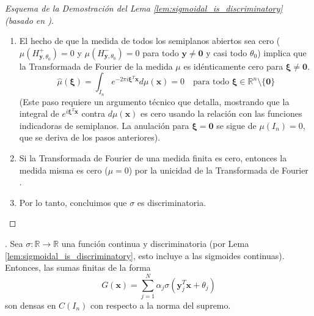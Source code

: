 \begin{proof}[Esquema de la Demostración del Lema \ref{lem:sigmoidal_is_discriminatory} (basado en \citet{Cybenko1989})]
\begin{enumerate}
        \item El hecho de que la medida de todos los semiplanos abiertos sea cero ($\mu(H_{\mathbf{y},\theta_0}^+) = 0$ y $\mu(H_{\mathbf{y},\theta_0}^-) = 0$ para todo $\mathbf{y} \neq \mathbf{0}$ y casi todo $\theta_0$) implica que la Transformada de Fourier de la medida $\mu$ es idénticamente cero para $\boldsymbol{\xi} \neq \mathbf{0}$.
        \[ \hat{\mu}(\boldsymbol{\xi}) = \int_{I_n} e^{-2\pi i \boldsymbol{\xi}^T \mathbf{x}} d\mu(\mathbf{x}) = 0 \quad \text{para todo } \boldsymbol{\xi} \in \mathbb{R}^n \setminus \{\mathbf{0}\} \]
        (Este paso requiere un argumento técnico que \citet{Cybenko1989} detalla, mostrando que la integral de $e^{i \boldsymbol{\xi}^T \mathbf{x}}$ contra $d\mu(\mathbf{x})$ es cero usando la relación con las funciones indicadoras de semiplanos. La anulación para $\boldsymbol{\xi}=\mathbf{0}$ se sigue de $\mu(I_n)=0$, que se deriva de los pasos anteriores).
        \item Si la Transformada de Fourier de una medida finita es cero, entonces la medida misma es cero ($\mu=0$) por la unicidad de la Transformada de Fourier \citep[Capítulo 9]{Rudin1987}.
        \item Por lo tanto, concluimos que $\sigma$ es discriminatoria.
    \end{enumerate}
\end{proof}

\begin{theorem}
\label{thm:uat_cybenko}
\citep{Cybenko1989}. Sea $\sigma: \mathbb{R} \to \mathbb{R}$ una función continua y discriminatoria (por Lema \ref{lem:sigmoidal_is_discriminatory}, esto incluye a las sigmoides continuas). Entonces, las sumas finitas de la forma
\[ G(\mathbf{x}) = \sum_{j=1}^{N} \alpha_j \sigma(\mathbf{y}_j^T \mathbf{x} + \theta_j) \]
son densas en $C(I_n)$ con respecto a la norma del supremo.
\end{theorem}

